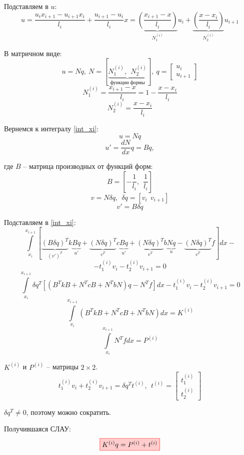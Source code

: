 Подставляем в $u$:
\[u = \frac{u_ix_{i+1} - u_{i+1} x_i}{l_i} + \frac{u_{i+1} - u_i}{l_i} x = \underbrace{\left(\frac{x_{i+1} - x}{l_i} \right)}_{N_1^{(i)}} u_i + \underbrace{\left(\frac{x - x_i}{l_i} \right)}_{N_2^{(i)}} u_{i+1}\]

В матричном виде:
\[u = Nq,\ N = [ \underbrace{N_1^{(i)},\ \ N_2^{(i)}}_{\text{функции формы}}],\ q = 
\begin{bmatrix}
u_i \\
u_{i+1}
\end{bmatrix}
\]
\[N_1^{(i)} = \frac{x_{i+1} - x}{l_i} = 1 - \frac{x - x_i}{l_i}\]
\[N_2^{(i)} = \frac{x - x_i}{l_i}\]

Вернемся к интегралу \eqref{int_xi}:
\[u = Nq\]
\[u' = \frac{dN}{dx}q = Bq,\]

где $B$ -- матрица производных от функций форм:
\[B = \left[ -\frac{1}{l_i},\ \ \frac{1}{l_i} \right]\]
\[v = N \delta q,\ \ \delta q = [v_i\ \ v_{i+1}]\]
\[v' = B \delta q\]

Подставляем в \eqref{int_xi}:
\[\int \limits_{x_i}^{x_{i+1}} [ \underbrace{ (B \delta q)^T}_{(v')^T } k \underbrace{Bq}_{u' } + \underbrace{(N \delta q)^T}_{v^T } c \underbrace{Bq}_{u' } + \underbrace{(N \delta q)^T}_{v^T } b \underbrace{Nq}_{u } - \underbrace{(N \delta q)^T}_{v^T } f] dx-\]\[ - t_1^{(i)}v_i - t_2^{(i)}v_{i+1} = 0\]
\[\int \limits_{x_i}^{x_{i+1}}  \delta q^T [(B^T k B + N^T c B + N^T b N)q - N^T f] dx - t_1^{(i)}v_i - t_2^{(i)}v_{i+1} = 0\]
\[\int \limits_{x_i}^{x_{i+1}} (B^T k B + N^T c B + N^T b N )dx = K^{(i)}\]
\[\int \limits_{x_i}^{x_{i+1}} N^T f dx = P^{(i)}\]

$K^{(i)}$ и $P^{(i)}$ -- матрицы $2 \times 2$.
\[t_1^{(i)}v_i + t_2^{(i)}v_{i+1} = \delta q^T t^{(i)},\ \ t^{(i)} = 
\begin{bmatrix}
t_1^{(i)} \\
t_2^{(i)}
\end{bmatrix}
\]

$\delta q^T \neq 0$, поэтому можно сократить.

Получившаяся СЛАУ:
\[
\fcolorbox{red}{red!20}{$K^{(i)} q = P^{(i)} + t^{(i)}$}
\]




























